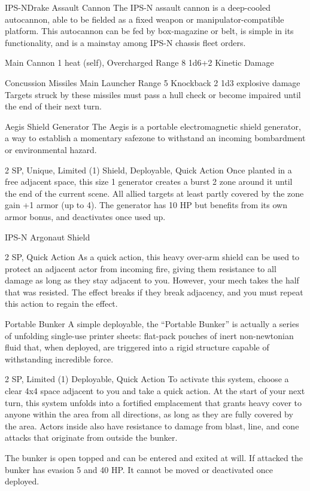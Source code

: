 \begin{mech}{IPS-N}{Drake}
Assault Cannon
The IPS-N assault cannon is a deep-cooled autocannon, able to be fielded as a fixed weapon or manipulator-compatible platform. This autocannon can be fed by box-magazine or belt, is simple in its functionality, and is a mainstay among IPS-N chassis fleet orders.

Main Cannon
1 heat (self), Overcharged
Range 8
1d6+2 Kinetic Damage

Concussion Missiles
Main Launcher
Range 5
Knockback 2
1d3 explosive damage
Targets struck by these missiles must pass a hull check or become impaired until the end of their next turn.

Aegis Shield Generator
The Aegis is a portable electromagnetic shield generator, a way to establish a momentary safezone to withstand an incoming bombardment or environmental hazard.

2 SP, Unique, Limited (1)
Shield, Deployable, Quick Action
Once planted in a free adjacent space, this size 1 generator creates a burst 2 zone around it until the end of the current scene. All allied targets at least partly covered by the zone gain +1 armor (up to 4). The generator has 10 HP but benefits from its own armor bonus, and deactivates once used up.

IPS-N Argonaut Shield

2 SP, Quick Action
As a quick action, this heavy over-arm shield can be used to protect an adjacent actor from incoming fire, giving them resistance to all damage as long as they stay adjacent to you. However, your mech takes the half that was resisted. The effect breaks if they break adjacency, and you must repeat this action to regain the effect.

Portable Bunker
A simple deployable, the ``Portable Bunker'' is actually a series of unfolding single-use printer sheets: flat-pack pouches of inert non-newtonian fluid that, when deployed, are triggered into a rigid structure capable of withstanding incredible force.

2 SP, Limited (1)
Deployable, Quick Action
To activate this system, choose a clear 4x4 space adjacent to you and take a quick action. At the start of your next turn, this system unfolds into a fortified emplacement that grants heavy cover to anyone within the area from all directions, as long as they are fully covered by the area. Actors inside also have resistance to damage from blast, line, and cone attacks that originate from outside the bunker.

The bunker is open topped and can be entered and exited at will. If attacked the bunker has evasion 5 and 40 HP. It cannot be moved or deactivated once deployed.


\end{mech}
